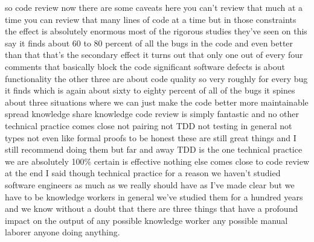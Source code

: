 \documentclass[conference, compsoc, twoside]{IEEEtran}
\begin{document}
so code review now there are some caveats here you can't review that much at a time you can review that many lines of code at a time but in those constraints the effect is absolutely enormous most of the rigorous studies they've seen on this say it finds about 60 to 80 percent of all the bugs in the code and even better than that that's the secondary effect it turns out that only one out of every four comments that basically block the code significant software defects is about functionality the other three are about code quality so very roughly for every bug it finds which is again about sixty to eighty percent of all of the bugs it spines about three situations where we can just make the code better more maintainable spread knowledge share knowledge code review is simply fantastic and no other technical practice comes close not pairing not TDD not testing in general not types not even like formal proofs to be honest these are still great things and I still recommend doing them but far and away TDD is the one technical practice we are absolutely 100\% certain is effective nothing else comes close to code review at the end I said though technical practice for a reason we haven't studied software engineers as much as we really should have as I've made clear but we have to be knowledge workers in general we've studied them for a hundred years and we know without a doubt that there are three things that have a profound impact on the output of any possible knowledge worker any possible manual laborer anyone doing anything.
\end{document}
